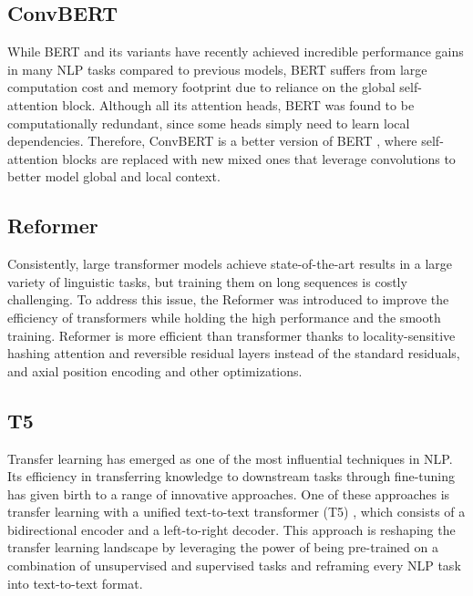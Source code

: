 \documentclass{article}
\begin{document}
\subsection{ConvBERT}
While BERT \cite{devlin2018bert} and its variants have recently achieved incredible performance gains in many NLP tasks compared to previous models, BERT suffers from large computation cost and memory footprint due to reliance on the global self-attention block. Although all its attention heads, BERT was found to be computationally redundant, since some heads simply need to learn local dependencies. Therefore, ConvBERT \cite{jiang2020convbert} is a better version of BERT \cite{devlin2018bert}, where self-attention blocks are replaced with new mixed ones that leverage convolutions to better model global and local context.

\subsection{Reformer}
Consistently, large transformer \cite{vaswani2017attention} models achieve state-of-the-art results in a large variety of linguistic tasks, but training them on long sequences is costly challenging. To address this issue, the Reformer \cite{kitaev2020reformer} was introduced to improve the efficiency of transformers while holding the high performance and the smooth training. Reformer is more efficient than transformer \cite{vaswani2017attention} thanks to locality-sensitive hashing attention and reversible residual layers instead of the standard residuals, and axial position encoding and other optimizations.

\subsection{T5}
Transfer learning has emerged as one of the most influential techniques in NLP. Its efficiency in transferring knowledge to downstream tasks through fine-tuning has given birth to a range of innovative approaches. One of these approaches is transfer learning with a unified text-to-text transformer (T5) \cite{raffel2020exploring}, which consists of a bidirectional encoder and a left-to-right decoder. This approach is reshaping the transfer learning landscape by leveraging the power of being pre-trained on a combination of unsupervised and supervised tasks and reframing every NLP task into text-to-text format.
\end{document}
